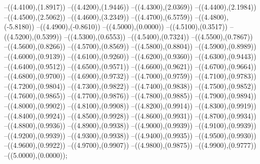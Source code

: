 {	--({\sx*(4.4100)},{\sy*(1.8917)})
	--({\sx*(4.4200)},{\sy*(1.9446)})
	--({\sx*(4.4300)},{\sy*(2.0369)})
	--({\sx*(4.4400)},{\sy*(2.1984)})
	--({\sx*(4.4500)},{\sy*(2.5062)})
	--({\sx*(4.4600)},{\sy*(3.2349)})
	--({\sx*(4.4700)},{\sy*(6.5759)})
	--({\sx*(4.4800)},{\sy*(-5.8180)})
	--({\sx*(4.4900)},{\sy*(-0.8610)})
	--({\sx*(4.5000)},{\sy*(0.0000)})
	--({\sx*(4.5100)},{\sy*(0.3517)})
	--({\sx*(4.5200)},{\sy*(0.5399)})
	--({\sx*(4.5300)},{\sy*(0.6553)})
	--({\sx*(4.5400)},{\sy*(0.7324)})
	--({\sx*(4.5500)},{\sy*(0.7867)})
	--({\sx*(4.5600)},{\sy*(0.8266)})
	--({\sx*(4.5700)},{\sy*(0.8569)})
	--({\sx*(4.5800)},{\sy*(0.8804)})
	--({\sx*(4.5900)},{\sy*(0.8989)})
	--({\sx*(4.6000)},{\sy*(0.9139)})
	--({\sx*(4.6100)},{\sy*(0.9260)})
	--({\sx*(4.6200)},{\sy*(0.9360)})
	--({\sx*(4.6300)},{\sy*(0.9443)})
	--({\sx*(4.6400)},{\sy*(0.9512)})
	--({\sx*(4.6500)},{\sy*(0.9571)})
	--({\sx*(4.6600)},{\sy*(0.9621)})
	--({\sx*(4.6700)},{\sy*(0.9664)})
	--({\sx*(4.6800)},{\sy*(0.9700)})
	--({\sx*(4.6900)},{\sy*(0.9732)})
	--({\sx*(4.7000)},{\sy*(0.9759)})
	--({\sx*(4.7100)},{\sy*(0.9783)})
	--({\sx*(4.7200)},{\sy*(0.9804)})
	--({\sx*(4.7300)},{\sy*(0.9822)})
	--({\sx*(4.7400)},{\sy*(0.9838)})
	--({\sx*(4.7500)},{\sy*(0.9852)})
	--({\sx*(4.7600)},{\sy*(0.9865)})
	--({\sx*(4.7700)},{\sy*(0.9876)})
	--({\sx*(4.7800)},{\sy*(0.9885)})
	--({\sx*(4.7900)},{\sy*(0.9894)})
	--({\sx*(4.8000)},{\sy*(0.9902)})
	--({\sx*(4.8100)},{\sy*(0.9908)})
	--({\sx*(4.8200)},{\sy*(0.9914)})
	--({\sx*(4.8300)},{\sy*(0.9919)})
	--({\sx*(4.8400)},{\sy*(0.9924)})
	--({\sx*(4.8500)},{\sy*(0.9928)})
	--({\sx*(4.8600)},{\sy*(0.9931)})
	--({\sx*(4.8700)},{\sy*(0.9934)})
	--({\sx*(4.8800)},{\sy*(0.9936)})
	--({\sx*(4.8900)},{\sy*(0.9938)})
	--({\sx*(4.9000)},{\sy*(0.9939)})
	--({\sx*(4.9100)},{\sy*(0.9939)})
	--({\sx*(4.9200)},{\sy*(0.9939)})
	--({\sx*(4.9300)},{\sy*(0.9938)})
	--({\sx*(4.9400)},{\sy*(0.9935)})
	--({\sx*(4.9500)},{\sy*(0.9930)})
	--({\sx*(4.9600)},{\sy*(0.9922)})
	--({\sx*(4.9700)},{\sy*(0.9907)})
	--({\sx*(4.9800)},{\sy*(0.9875)})
	--({\sx*(4.9900)},{\sy*(0.9777)})
	--({\sx*(5.0000)},{\sy*(0.0000)});
}
\def\xwertef{
\fill[color=red] (0.0000,0) circle[radius={0.07/\skala}];
\fill[color=red] (0.4167,0) circle[radius={0.07/\skala}];
\fill[color=red] (0.8333,0) circle[radius={0.07/\skala}];
\fill[color=red] (1.2500,0) circle[radius={0.07/\skala}];
\fill[color=red] (1.6667,0) circle[radius={0.07/\skala}];
\fill[color=red] (2.0833,0) circle[radius={0.07/\skala}];
\fill[color=red] (2.5000,0) circle[radius={0.07/\skala}];
\fill[color=red] (2.9167,0) circle[radius={0.07/\skala}];
\fill[color=red] (3.3333,0) circle[radius={0.07/\skala}];
\fill[color=red] (3.7500,0) circle[radius={0.07/\skala}];
\fill[color=red] (4.1667,0) circle[radius={0.07/\skala}];
\fill[color=red] (4.5833,0) circle[radius={0.07/\skala}];
\fill[color=red] (5.0000,0) circle[radius={0.07/\skala}];
}
